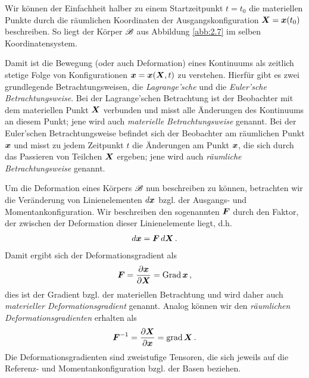\begin{bem}
Wir können der Einfachheit halber zu einem Startzeitpunkt $t = t_0$ die materiellen Punkte durch die räumlichen Koordinaten der Ausgangskonfiguration $\boldsymbol X = \boldsymbol x(t_0)$ beschreiben. So liegt der Körper $\mathscr B$ aus Abbildung \ref{abb:2.7} im selben Koordinatensystem.
\end{bem}


Damit ist die Bewegung (oder auch Deformation) eines Kontinuums als zeitlich stetige Folge von Konfigurationen $\boldsymbol x = \boldsymbol x(\boldsymbol X,t)$ zu verstehen. Hierfür gibt es zwei grundlegende Betrachtungsweisen, die \textit{{Lagrange'sche}} und die \textit{Euler'sche Betrachtungsweise}. Bei der Lagrange'schen Betrachtung ist der Beobachter mit dem materiellen Punkt $\boldsymbol X$ verbunden und misst alle Änderungen des Kontinuums an diesem Punkt; jene wird auch \textit{materielle Betrachtungsweise} genannt. Bei der Euler'schen Betrachtungsweise befindet sich der Beobachter am räumlichen Punkt $\boldsymbol x$ und misst zu jedem Zeitpunkt $t$ die Änderungen am Punkt $\boldsymbol x$, die sich durch das Passieren von Teilchen $\boldsymbol X$ ergeben; jene wird auch \textit{räumliche Betrachtungsweise} genannt.


Um die Deformation eines Körpers $\mathscr B$ nun beschreiben zu können, betrachten wir die Veränderung von Linienelementen $d \boldsymbol x$ bzgl. der Ausgangs- und Momentankonfiguration. Wir beschreiben den sogenannten \textit{} $\boldsymbol F$ durch den Faktor, der zwischen der Deformation dieser Linienelemente liegt, d.h.
\begin{align}\label{eq:2.21}
	d\boldsymbol x = \boldsymbol F \, d\boldsymbol X \, .
\end{align}
Damit ergibt sich der Deformationsgradient als
\begin{align}\label{eq:2.22}
	\boldsymbol F = \frac{\partial \boldsymbol x}{\partial \boldsymbol X} = \operatorname{Grad} \boldsymbol x \, , 
\end{align}
dies ist der Gradient bzgl. der materiellen Betrachtung und wird daher auch \textit{materieller Deformationsgradient} genannt. Analog können wir den \textit{räumlichen Deformationsgradienten} erhalten als
\begin{align}\label{eq:2.23}
	\boldsymbol F^{-1} = \frac{\partial \boldsymbol X}{\partial \boldsymbol x} = \operatorname{grad} \boldsymbol X \, .
\end{align}
Die Deformationsgradienten sind zweistufige Tensoren, die sich jeweils auf die Referenz- und Momentankonfiguration bzgl. der Basen beziehen.

